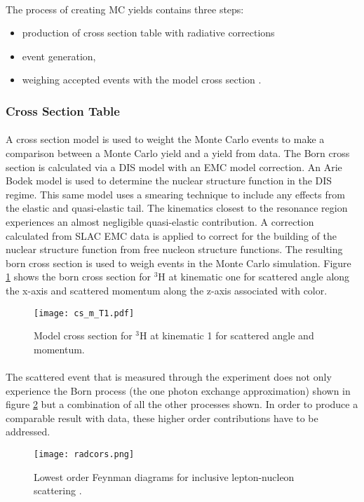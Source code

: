 \paragraph{}The process of creating MC yields contains three steps: 
\begin{itemize}
	\item production of cross section table with radiative corrections
	\item event generation,
	\item weighing accepted events with the model cross section .
\end{itemize} 
\subsubsection{Cross Section Table}
\vspace{-10pt}\paragraph{} A cross section model is used to weight the Monte Carlo events to make a comparison between a Monte Carlo yield and a yield from data. The Born cross section is calculated via a DIS model with an EMC model correction. An Arie Bodek model \cite{DISmodel} is used to determine the nuclear structure function in the DIS regime. This same model uses a smearing technique to include any effects from the elastic and quasi-elastic tail. The kinematics closest to the resonance region experiences an almost negligible quasi-elastic contribution. A correction calculated from SLAC EMC data is applied to correct for the building of the nuclear structure function from free nucleon structure functions. The resulting born cross section is used to weigh events in the Monte Carlo simulation. Figure \ref{MCS} shows the born cross section for $^3$H at kinematic one for scattered angle along the x-axis and scattered momentum along the z-axis associated with color.  

\begin{figure}[t!]
	\texttt{[image: cs\_m\_T1.pdf]}
		\caption{Model cross section for $^3$H at kinematic 1 for scattered angle and momentum. \label{MCS}}
\end{figure}
\paragraph{} The scattered event that is measured through the experiment does not only experience the Born process (the one photon exchange approximation) shown in figure \ref{fig:radcors} but a combination of all the other processes shown. In order to produce a comparable result with data, these higher order contributions have to be addressed.
\begin{figure}[]
	\centering
	\texttt{[image: radcors.png]}
	\caption{Lowest order Feynman diagrams for inclusive lepton-nucleon scattering \cite{Ajth}.}
	\label{fig:radcors}
\end{figure} 
